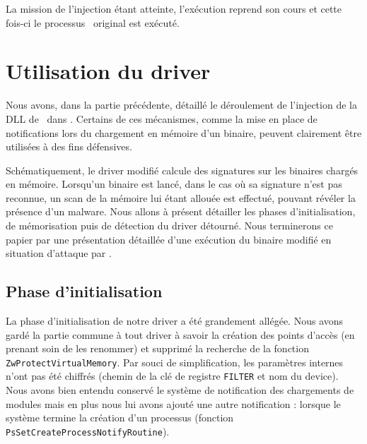 La mission de l'injection étant atteinte, l'exécution reprend son cours et cette fois-ci le processus \service\ original est exécuté.

\section{Utilisation du driver}
\label{section:utilisation}


Nous avons, dans la partie précédente, détaillé le déroulement de l'injection de la DLL de \Duqu\ dans \service. Certains de ces mécanismes, comme la mise en place de notifications lors du chargement en mémoire d'un binaire, peuvent clairement être utilisées à des fins défensives.

Schématiquement, le driver modifié calcule des signatures sur les binaires chargés en mémoire. Lorsqu'un binaire est lancé, dans le cas où sa signature n'est pas reconnue, un scan de la mémoire lui étant allouée est effectué, pouvant révéler la présence d'un malware.
Nous allons à présent détailler les phases d'initialisation, de mémorisation puis de détection du driver détourné. Nous terminerons ce papier par une présentation détaillée d'une exécution du binaire modifié en situation d'attaque par \Duqu.

\subsection{Phase d'initialisation}
La phase d'initialisation de notre driver a été grandement allégée. Nous avons gardé la partie commune à tout driver à savoir la création des points d'accès (en prenant soin de les renommer) et supprimé la recherche de la fonction \texttt{ZwProtectVirtualMemory}. Par souci de simplification, les paramètres internes n'ont pas été chiffrés (chemin de la clé de registre \texttt{FILTER} et nom du device). Nous avons bien entendu conservé le système de notification des chargements de modules mais en plus nous lui avons ajouté une autre notification : lorsque le système termine la création d'un processus (fonction \texttt{PsSetCreateProcessNotifyRoutine}).


